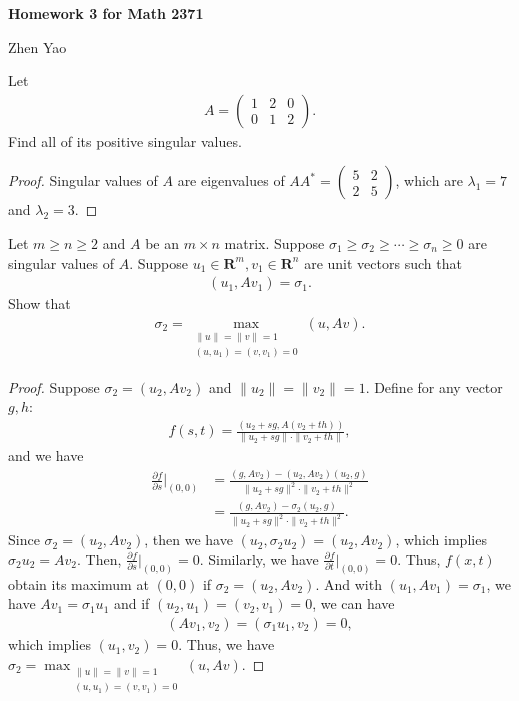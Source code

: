 \documentclass[12pt,leqno]{amsart}
\begin{document}
\centerline{\bf Homework 3 for Math 2371}
\centerline{Zhen Yao}

\medskip

 Let 
\begin{align*}
    A = \begin{pmatrix}
    1 & 2 & 0 \\
    0 & 1 & 2
    \end{pmatrix}.
\end{align*}
Find all of its positive singular values.
\begin{proof}
Singular values of $A$ are eigenvalues of $AA^* = \begin{pmatrix}
    5 & 2  \\
    2 & 5 
    \end{pmatrix}$, which are $\lambda_1 = 7$ and $\lambda_2 = 3$.
\end{proof}

\medskip

 Let $m \geq n \geq 2$ and $A$ be an $m\times n$ matrix. Suppose $\sigma_1 \geq \sigma_2 \geq \cdots \geq \sigma_n \geq 0$ are singular values of $A$. Suppose $u_1\in \mathbf{R}^m, v_1 \in \mathbf{R}^n$  are unit vectors such that 
\begin{align*}
    (u_1, Av_1) = \sigma_1.
\end{align*}
Show that 
\begin{align*}
    \sigma_2 = \max_{ \substack{\|u\| = \|v\| = 1\\
                     (u,u_1) = (v, v_1) = 0}}
    (u, Av).
\end{align*}
\begin{proof}
Suppose $\sigma_2 = (u_2, Av_2)$ and $\|u_2\| = \|v_2\| = 1$. Define for any vector $g,h$:
\begin{align*}
    f(s,t) = \frac{(u_2+sg, A(v_2+th))}{\|u_2+sg\|\cdot \|v_2+th\|},
\end{align*}
and we have
\begin{align*}
    \frac{\partial f}{\partial s}\bigg|_{(0,0)} & = \frac{(g, Av_2) - (u_2, Av_2)(u_2, g)}{\|u_2+sg\|^2\cdot \|v_2+th\|^2} \\
    & = \frac{(g, Av_2) - \sigma_2(u_2, g)}{\|u_2+sg\|^2\cdot \|v_2+th\|^2}.
\end{align*}
Since $\sigma_2 = (u_2, Av_2)$, then we have $(u_2,\sigma_2 u_2) = (u_2, Av_2)$, which implies $\sigma_2 u_2 = Av_2$. Then, $\frac{\partial f}{\partial s}\bigg|_{(0,0)} = 0$. Similarly, we have $\frac{\partial f}{\partial t}\bigg|_{(0,0)} = 0$. Thus, $f(x,t)$ obtain its maximum at $(0,0)$ if $\sigma_2 = (u_2, Av_2)$. And with $(u_1, Av_1) = \sigma_1$, we have $Av_1 = \sigma_1 u_1$ and if $(u_2,u_1) = (v_2, v_1) = 0$, we can have 
\begin{align*}
    (Av_1, v_2) = (\sigma_1 u_1, v_2) = 0,
\end{align*}
which implies $(u_1, v_2) = 0$. Thus, we have $\sigma_2 = \max_{ \substack{\|u\| = \|v\| = 1\\
                     (u,u_1) = (v, v_1) = 0}}
    (u, Av)$.
\end{proof}
\end{document}
